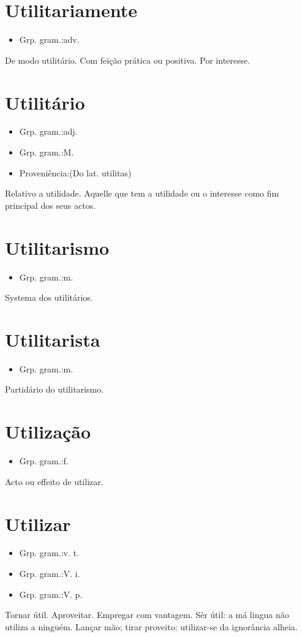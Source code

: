 \documentclass{article}
\begin{document}
\section{Utilitariamente}
\begin{itemize}
\item {Grp. gram.:adv.}
\end{itemize}
De modo utilitário.
Com feição prática ou positiva.
Por interesse.
\section{Utilitário}
\begin{itemize}
\item {Grp. gram.:adj.}
\end{itemize}
\begin{itemize}
\item {Grp. gram.:M.}
\end{itemize}
\begin{itemize}
\item {Proveniência:(Do lat. \textunderscore utilitas\textunderscore )}
\end{itemize}
Relativo a utilidade.
Aquelle que tem a utilidade ou o interesse como fim principal dos seus actos.
\section{Utilitarismo}
\begin{itemize}
\item {Grp. gram.:m.}
\end{itemize}
Systema dos utilitários.
\section{Utilitarista}
\begin{itemize}
\item {Grp. gram.:m.}
\end{itemize}
Partidário do utilitarismo.
\section{Utilização}
\begin{itemize}
\item {Grp. gram.:f.}
\end{itemize}
Acto ou effeito de utilizar.
\section{Utilizar}
\begin{itemize}
\item {Grp. gram.:v. t.}
\end{itemize}
\begin{itemize}
\item {Grp. gram.:V. i.}
\end{itemize}
\begin{itemize}
\item {Grp. gram.:V. p.}
\end{itemize}
Tornar útil.
Aproveitar.
Empregar com vantagem.
Sêr útil: \textunderscore a má lingua não utiliza a ninguém\textunderscore .
Lançar mão; tirar proveito: \textunderscore utilizar-se da ignorância alheia\textunderscore .
\end{document}
